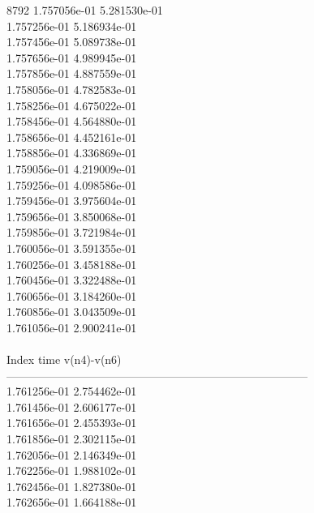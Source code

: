 8792	1.757056e-01	5.281530e-01	\\ 	1.757256e-01	5.186934e-01	\\ 	1.757456e-01	5.089738e-01	\\ 	1.757656e-01	4.989945e-01	\\ 	1.757856e-01	4.887559e-01	\\ 	1.758056e-01	4.782583e-01	\\ 	1.758256e-01	4.675022e-01	\\ 	1.758456e-01	4.564880e-01	\\ 	1.758656e-01	4.452161e-01	\\ 	1.758856e-01	4.336869e-01	\\ 	1.759056e-01	4.219009e-01	\\ 	1.759256e-01	4.098586e-01	\\ 	1.759456e-01	3.975604e-01	\\ 	1.759656e-01	3.850068e-01	\\ 	1.759856e-01	3.721984e-01	\\ 	1.760056e-01	3.591355e-01	\\ 	1.760256e-01	3.458188e-01	\\ 	1.760456e-01	3.322488e-01	\\ 	1.760656e-01	3.184260e-01	\\ 	1.760856e-01	3.043509e-01	\\ 	1.761056e-01	2.900241e-01	\\ \hline
\\ \hline
Index   time            v(n4)-v(n6)     \\ \hline
--------------------------------------------------------------------------------\\ 	1.761256e-01	2.754462e-01	\\ 	1.761456e-01	2.606177e-01	\\ 	1.761656e-01	2.455393e-01	\\ 	1.761856e-01	2.302115e-01	\\ 	1.762056e-01	2.146349e-01	\\ 	1.762256e-01	1.988102e-01	\\ 	1.762456e-01	1.827380e-01	\\ 	1.762656e-01	1.664188e-01	\\ \hline

